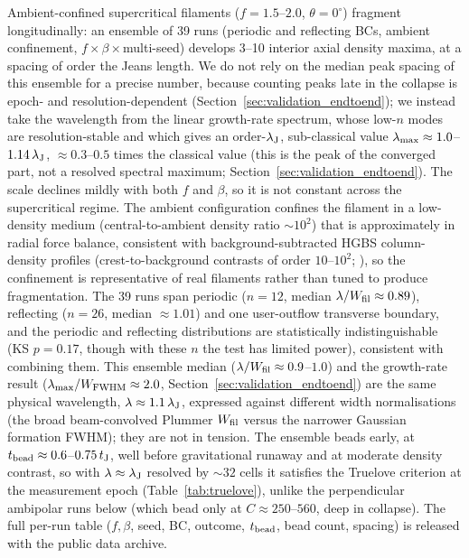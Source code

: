 \documentclass[usenatbib,twoside,twocolumn]{mnras}
\begin{document}
Ambient-confined supercritical filaments ($f=1.5$--$2.0$, $\theta=0^\circ$) fragment longitudinally: an ensemble of 39 runs (periodic and reflecting BCs, ambient confinement, $f\times\beta\times$multi-seed) develops 3--10 interior axial density maxima, at a spacing of order the Jeans length. We do not rely on the median peak spacing of this ensemble for a precise number, because counting peaks late in the collapse is epoch- and resolution-dependent (Section~\ref{sec:validation_endtoend}); we instead take the wavelength from the linear growth-rate spectrum, whose low-$n$ modes are resolution-stable and which gives an order-$\lambda_{\rm J}$, sub-classical value $\lambda_{\rm max}\approx1.0$--$1.14\,\lambda_{\rm J}$, $\approx0.3$--$0.5$ times the classical value (this is the peak of the converged part, not a resolved spectral maximum; Section~\ref{sec:validation_endtoend}). The scale declines mildly with both $f$ and $\beta$, so it is not constant across the supercritical regime. The ambient configuration confines the filament in a low-density medium (central-to-ambient density ratio $\sim10^2$) that is approximately in radial force balance, consistent with background-subtracted HGBS column-density profiles (crest-to-background contrasts of order $10$--$10^2$; \citealt{Arzoumanian2019}), so the confinement is representative of real filaments rather than tuned to produce fragmentation. The 39 runs span periodic ($n=12$, median $\lambda/W_{\rm fil}\approx0.89$), reflecting ($n=26$, median $\approx1.01$) and one user-outflow transverse boundary, and the periodic and reflecting distributions are statistically indistinguishable (KS $p=0.17$, though with these $n$ the test has limited power), consistent with combining them. This ensemble median ($\lambda/W_{\rm fil}\approx0.9$--$1.0$) and the growth-rate result ($\lambda_{\rm max}/W_{\rm FWHM}\approx2.0$, Section~\ref{sec:validation_endtoend}) are the same physical wavelength, $\lambda\approx1.1\,\lambda_{\rm J}$, expressed against different width normalisations (the broad beam-convolved Plummer $W_{\rm fil}$ versus the narrower Gaussian formation FWHM); they are not in tension. The ensemble beads early, at $t_{\rm bead}\approx0.6$--$0.75\,t_{\rm J}$, well before gravitational runaway and at moderate density contrast, so with $\lambda\approx\lambda_{\rm J}$ resolved by ${\sim}32$ cells it satisfies the Truelove criterion at the measurement epoch (Table~\ref{tab:truelove}), unlike the perpendicular ambipolar runs below (which bead only at $C\approx250$--$560$, deep in collapse). The full per-run table ($f,\beta$, seed, BC, outcome, $t_{\rm bead}$, bead count, spacing) is released with the public data archive.
\end{document}
